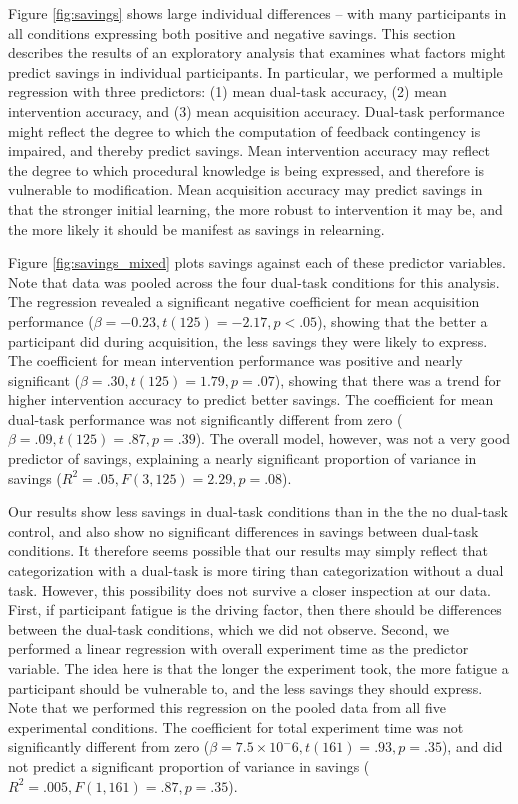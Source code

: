Figure \ref{fig:savings} shows large individual differences -- with many
participants in all conditions expressing both positive and negative savings.
This section describes the results of an exploratory analysis that examines what
factors might predict savings in individual participants. In particular, we
performed a multiple regression with three predictors: (1) mean dual-task
accuracy, (2) mean intervention accuracy, and (3) mean acquisition accuracy.
Dual-task performance might reflect the degree to which the computation of
feedback contingency is impaired, and thereby predict savings. Mean intervention
accuracy may reflect the degree to which procedural knowledge is being
expressed, and therefore is vulnerable to modification. Mean acquisition
accuracy may predict savings in that the stronger initial learning, the more
robust to intervention it may be, and the more likely it should be manifest as
savings in relearning.

Figure \ref{fig:savings_mixed} plots savings against each of these predictor
variables. Note that data was pooled across the four dual-task conditions for
this analysis. The regression revealed a significant negative coefficient for
mean acquisition performance ($\beta=-0.23, t(125)=-2.17, p<.05$), showing that
the better a participant did during acquisition, the less savings they were
likely to express. The coefficient for mean intervention performance was
positive and nearly significant ($\beta=.30, t(125)=1.79, p=.07$), showing that
there was a trend for higher intervention accuracy to predict better savings.
The coefficient for mean dual-task performance was not significantly different
from zero ($\beta=.09, t(125)=.87, p=.39$). The overall model, however, was not
a very good predictor of savings, explaining a nearly significant proportion of
variance in savings ($R^2=.05, F(3,125)=2.29, p=.08$).

Our results show less savings in dual-task conditions than in the the no
dual-task control, and also show no significant differences in savings between
dual-task conditions. It therefore seems possible that our results may simply
reflect that categorization with a dual-task is more tiring than categorization
without a dual task. However, this possibility does not survive a closer
inspection at our data. First, if participant fatigue is the driving factor,
then there should be differences between the dual-task conditions, which we did
not observe. Second, we performed a linear regression with overall experiment
time as the predictor variable. The idea here is that the longer the experiment
took, the more fatigue a participant should be vulnerable to, and the less
savings they should express. Note that we performed this regression on the
pooled data from all five experimental conditions. The coefficient for total
experiment time was not significantly different from zero ($\beta=7.5 \times
10^-6, t(161)=.93, p=.35$), and did not predict a significant proportion of
variance in savings ($R^2=.005, F(1,161)=.87, p=.35$).

